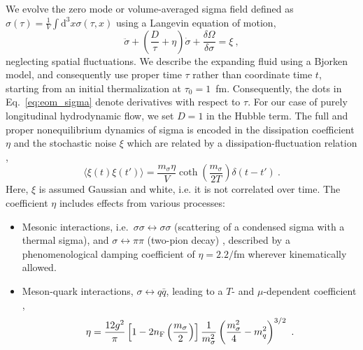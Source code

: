 \documentclass[%
 reprint,
 amsmath,amssymb,
 aps,
]{revtex4-2}
\begin{document}
We evolve the zero mode or volume-averaged sigma field defined as $\sigma(\tau)=\frac{1}{V}\int\mathrm d^3 x\sigma(\tau,x)$ using a Langevin equation of motion, 
\begin{equation}
 \label{eq:eom_sigma}
 \ddot\sigma+\left(\frac{D}{\tau}+\eta\right)\dot\sigma+\frac{\delta\Omega}{\delta\sigma}=\xi~,
\end{equation}
neglecting spatial fluctuations. 
We describe the expanding fluid using a Bjorken model, and consequently use proper time $\tau$ rather than coordinate time $t$, starting from an initial thermalization at $\tau_0=1$~fm. Consequently, the dots in Eq.~\eqref{eq:eom_sigma} denote derivatives with respect to $\tau$. For our case of purely longitudinal hydrodynamic flow, we set $D=1$ in the Hubble term. The full and proper nonequilibrium dynamics of sigma is encoded in the dissipation coefficient $\eta$ and the stochastic noise $\xi$ which are related by a dissipation-fluctuation relation \cite{Nahrgang:2011mg}, 
\begin{equation}
\label{eq:dissfluct}
 \langle\xi(t)\xi(t')\rangle=\frac{m_{\sigma}\eta}{V}\coth{\left(\frac{m_{\sigma}}{2T}\right)}\delta(t-t')~.
\end{equation}
Here, $\xi$ is assumed Gaussian and white, i.e. it is not correlated over time. The coefficient $\eta$ includes effects from various processes:
\begin{itemize}
    \item Mesonic interactions, i.e.\  $\sigma\sigma\leftrightarrow\sigma\sigma$ (scattering of a condensed sigma with a thermal sigma), and  $\sigma\leftrightarrow\pi\pi$ (two-pion decay) \cite{Csernai:1999ca}, described by a phenomenological damping coefficient of $\eta=2.2/$fm \cite{Biro:1997va} wherever kinematically allowed. 
    \item Meson-quark interactions, $\sigma\leftrightarrow q\bar q$, leading to a $T$- and $\mu$-dependent coefficient \cite{Nahrgang:2011mg}, 
    \begin{equation}
        \eta=\frac{12 g^2}{\pi}\left[1-2n_{\rm F}\left(\frac{m_\sigma}{2}\right)\right]\frac{1}{m_\sigma^2}\left(\frac{m_\sigma^2}{4}-m_q^2\right)^{3/2}~.
    \end{equation}
\end{itemize}
\end{document}
